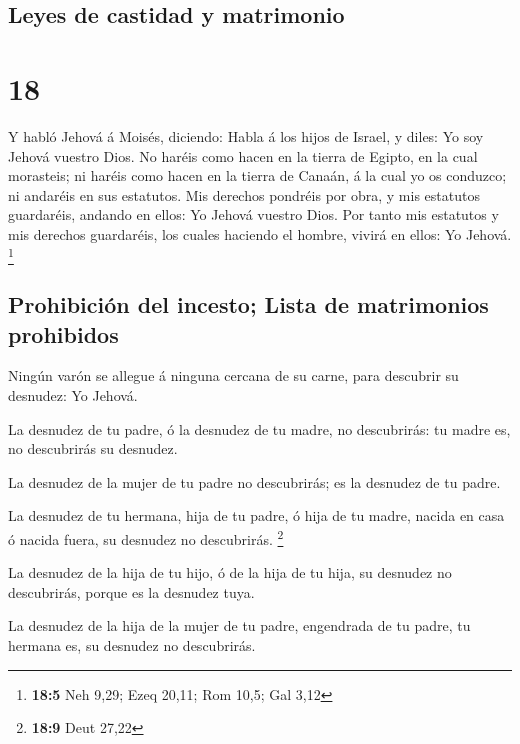 \hypertarget{leyes-de-castidad-y-matrimonio}{%
\subsection{Leyes de castidad y
matrimonio}\label{leyes-de-castidad-y-matrimonio}}

\hypertarget{section-17}{%
\section{18}\label{section-17}}

 Y habló Jehová á Moisés, diciendo:  Habla á
los hijos de Israel, y diles: Yo soy Jehová vuestro Dios. 
No haréis como hacen en la tierra de Egipto, en la cual morasteis; ni
haréis como hacen en la tierra de Canaán, á la cual yo os conduzco; ni
andaréis en sus estatutos.  Mis derechos pondréis por
obra, y mis estatutos guardaréis, andando en ellos: Yo Jehová vuestro
Dios.  Por tanto mis estatutos y mis derechos guardaréis,
los cuales haciendo el hombre, vivirá en ellos: Yo Jehová. \footnote{\textbf{18:5}
  Neh 9,29; Ezeq 20,11; Rom 10,5; Gal 3,12}

\hypertarget{prohibiciuxf3n-del-incesto-lista-de-matrimonios-prohibidos}{%
\subsection{Prohibición del incesto; Lista de matrimonios
prohibidos}\label{prohibiciuxf3n-del-incesto-lista-de-matrimonios-prohibidos}}

 Ningún varón se allegue á ninguna cercana de su carne,
para descubrir su desnudez: Yo Jehová.

 La desnudez de tu padre, ó la desnudez de tu madre, no
descubrirás: tu madre es, no descubrirás su desnudez.

 La desnudez de la mujer de tu padre no descubrirás; es la
desnudez de tu padre.

 La desnudez de tu hermana, hija de tu padre, ó hija de tu
madre, nacida en casa ó nacida fuera, su desnudez no descubrirás.
\footnote{\textbf{18:9} Deut 27,22}

 La desnudez de la hija de tu hijo, ó de la hija de tu
hija, su desnudez no descubrirás, porque es la desnudez tuya.

 La desnudez de la hija de la mujer de tu padre,
engendrada de tu padre, tu hermana es, su desnudez no descubrirás.

